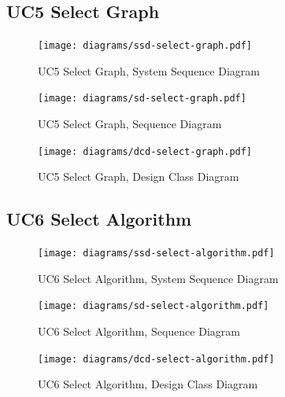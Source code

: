 \subsection{UC5 Select Graph}
\begin{figure}[p]
    \centering
    \texttt{[image: diagrams/ssd-select-graph.pdf]}
    \caption{UC5 Select Graph, System Sequence Diagram}
    \label{fig:select-graph-ssd}
\end{figure}
\begin{figure}[p]
    \centering
    \texttt{[image: diagrams/sd-select-graph.pdf]}
    \caption{UC5 Select Graph, Sequence Diagram}
    \label{fig:select-graph-sd}
\end{figure}
\begin{figure}[p]
    \centering
    \texttt{[image: diagrams/dcd-select-graph.pdf]}
    \caption{UC5 Select Graph, Design Class Diagram}
    \label{fig:select-graph-dcd}
\end{figure}
% 
\subsection{UC6 Select Algorithm}
\begin{figure}[p]
    \centering
    \texttt{[image: diagrams/ssd-select-algorithm.pdf]}
    \caption{UC6 Select Algorithm, System Sequence Diagram}
    \label{fig:select-algorithm-ssd}
\end{figure}
\begin{figure}[p]
    \centering
    \texttt{[image: diagrams/sd-select-algorithm.pdf]}
    \caption{UC6 Select Algorithm, Sequence Diagram}
    \label{fig:select-algorithm-sd}
\end{figure}
\begin{figure}[p]
    \centering
    \texttt{[image: diagrams/dcd-select-algorithm.pdf]}
    \caption{UC6 Select Algorithm, Design Class Diagram}
    \label{fig:select-algorithm-dcd}
\end{figure}
% 
